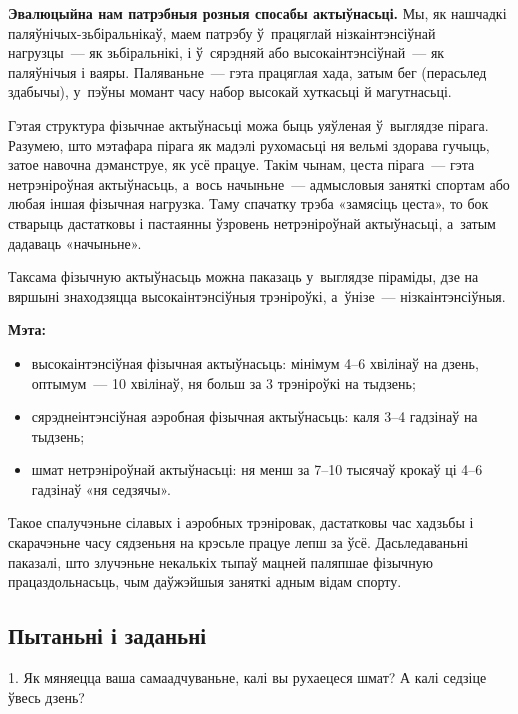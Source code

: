 \textbf{Эвалюцыйна нам патрэбныя розныя спосабы актыўнасьці.} Мы, як нашчадкі па\-ляў\-ні\-чых-зьбіральнікаў, маем патрэбу ў~працяглай нізкаінтэнсіўнай нагрузцы~--- як зьбіральнікі, і ў~сярэдняй або высокаінтэнсіўнай~--- як паляўнічыя і ваяры. Паляваньне~--- гэта працяглая хада, затым бег (перасьлед здабычы), у~пэўны момант часу набор высокай хуткасьці й магутнасьці.


Гэтая структура фізычнае актыўнасьці можа быць уяўленая ў~выглядзе пірага. Разумею, што мэтафара пірага як мадэлі рухомасьці ня вельмі здорава гучыць, затое навочна дэманструе, як усё працуе. Такім чынам, цеста пірага~--- гэта нетрэніроўная актыўнасьць, а~вось начыньне~--- адмысловыя заняткі спортам або любая іншая фізычная нагрузка. Таму спачатку трэба «замясіць цеста», то бок стварыць дастатковы і пастаянны ўзровень нетрэніроўнай актыўнасьці, а~затым дадаваць «начыньне».

Таксама фізычную актыўнасьць можна паказаць у~выглядзе піраміды, дзе на вяршыні знаходзяцца высокаінтэнсіўныя трэніроўкі, а~ўнізе~--- нізкаінтэнсіўныя.

\textbf{Мэта:}
\begin{itemize}
  \item высокаінтэнсіўная фізычная актыўнасьць: мінімум 4--6 хвілінаў на дзень, оптымум~--- 10 хвілінаў, ня больш за 3 трэніроўкі на тыдзень; 
  \item сярэднеінтэнсіўная аэробная фізычная актыўнасьць: каля 3--4 гадзінаў на тыдзень;
  \item шмат нетрэніроўнай актыўнасьці: ня менш за 7--10 тысячаў крокаў ці 4--6 гадзінаў «ня седзячы».
\end{itemize}

Такое спалучэньне сілавых і аэробных трэніровак, дастатковы час хадзьбы і скарачэньне часу сядзеньня на крэсьле працуе лепш за ўсё. Дасьледаваньні паказалі, што злучэньне некалькіх тыпаў мацней паляпшае фізычную працаздольнасьць, чым даўжэйшыя заняткі адным відам спорту.

\subsection*{Пытаньні і заданьні}

1. Як мяняецца ваша самаадчуваньне, калі вы рухаецеся шмат? А калі седзіце ўвесь дзень?

